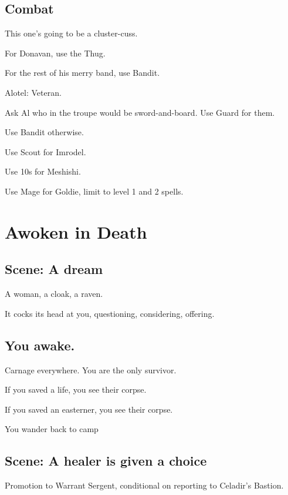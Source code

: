 \begin{multicols}{2}
\subsection{Combat}

This one's going to be a cluster-cuss.

For Donavan, use the Thug.

For the rest of his merry band, use Bandit.

Alotel: Veteran.

Ask Al who in the troupe would be sword-and-board.
Use Guard for them.

Use Bandit otherwise.

Use Scout for Imrodel.

Use 10s for Meshishi.

Use Mage for Goldie, limit to level 1 and 2 spells.

\section{Awoken in Death}
\subsection{Scene: A dream}

A woman, a cloak, a raven.

It cocks its head at you, questioning, considering, offering.

\subsection{You awake.}

Carnage everywhere.
You are the only survivor.

If you saved a life, you see their corpse.

If you saved an easterner, you see their corpse.

You wander back to camp

\subsection{Scene: A healer is given a choice}

Promotion to Warrant Sergent, conditional on reporting to Celadir's Bastion.

\end{multicols}
